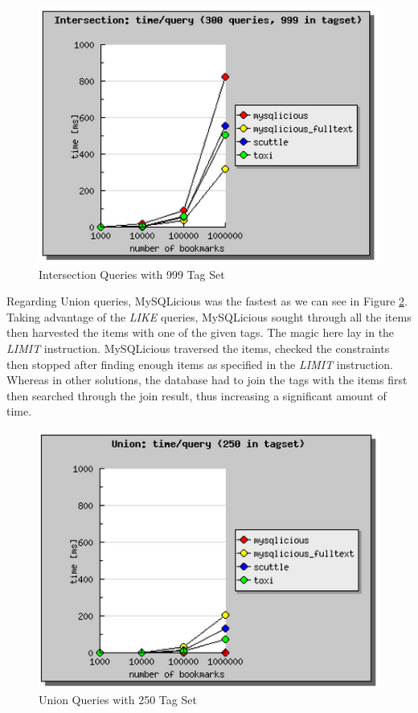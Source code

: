 \begin{figure}[!h]
\begin{centering}
\includegraphics[scale=0.8]{pics/intersection999}
\caption{Intersection Queries with 999 Tag Set}\label{fg:intersection999}
\end{centering}
\end{figure}

Regarding Union queries, MySQLicious was the fastest as we can see in Figure \ref{fg:union250}. Taking advantage of the \textit{LIKE} queries, MySQLicious sought through all the items then harvested the items with one of the given tags. The magic here lay in the \textit{LIMIT} instruction. MySQLicious traversed the items, checked the constraints then stopped after finding enough items as specified in the \textit{LIMIT} instruction. Whereas in other solutions, the database had to join the tags with the items first then searched through the join result, thus increasing a significant amount of time.

\begin{figure}[!h]
\begin{centering}
\includegraphics[scale=0.8]{pics/union250}
\caption{Union Queries with 250 Tag Set}\label{fg:union250}
\end{centering}
\end{figure}

